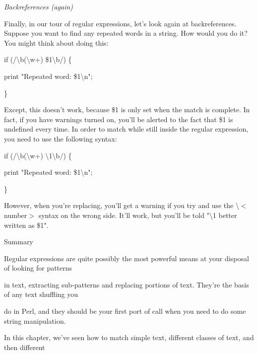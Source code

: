 \documentclass[a4paper,11pt]{book}
\begin{document}
\noindent 

\noindent \textit{Backreferences (again)}

\noindent Finally, in our tour of regular expressions, let's look again at backreferences. Suppose you want to find any repeated words in a string. How would you do it? You might think about doing this:

\noindent 

\noindent if (/\textbackslash b(\textbackslash w+) \$1\textbackslash b/) \{

\noindent print "Repeated word: \$1\textbackslash n";

\noindent \}

\noindent 

\noindent Except, this doesn't work, because \$1 is only set when the match is complete. In fact, if you have warnings turned on, you'll be alerted to the fact that \$1 is undefined every time. In order to match while still inside the regular expression, you need to use the following syntax:

\noindent 

\noindent 

\noindent if (/\textbackslash b(\textbackslash w+) \textbackslash 1\textbackslash b/) \{

\noindent print "Repeated word: \$1\textbackslash n";

\noindent \}

\noindent 

\noindent However, when you're replacing, you'll get a warning if you try and use the \textbackslash $<$number$>$ syntax on the wrong side. It'll work, but you'll be told "\textbackslash 1 better written as \$1".

\noindent 

\noindent 

\noindent Summary

\noindent 

\noindent Regular expressions are quite possibly the most powerful means at your disposal of looking for patterns

\noindent in text, extracting sub-patterns and replacing portions of text. They're the basis of any text shuffling you

\noindent do in Perl, and they should be your first port of call when you need to do some string manipulation.

\noindent 

\noindent In this chapter, we've seen how to match simple text, different classes of text, and then different
\end{document}
